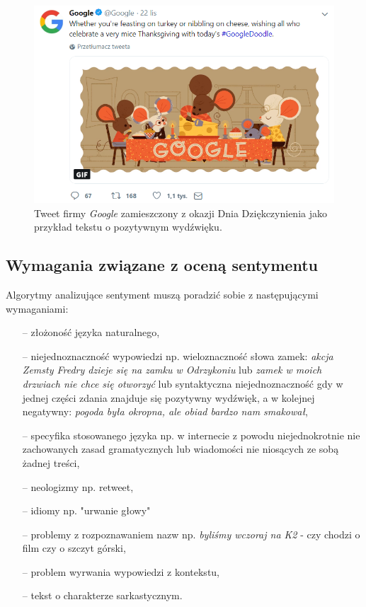 \begin{figure}[h] %
	\centering
	\includegraphics[width=0.8\linewidth]{img/nlp_google_tweet}
	\caption{Tweet firmy \textit{Google} zamieszczony z okazji Dnia Dziękczynienia jako przykład tekstu o pozytywnym wydźwięku.}
\end{figure}

\subsection{Wymagania związane z oceną sentymentu}
Algorytmy analizujące sentyment muszą poradzić sobie z następującymi wymaganiami:

\begin{itemize}
	\item[--] złożoność języka naturalnego,
	\item[--] niejednoznaczność wypowiedzi np. wieloznaczność słowa zamek: \textit{akcja Zemsty Fredry dzieje się na zamku w Odrzykoniu} lub \textit{zamek w moich drzwiach nie chce się otworzyć} lub syntaktyczna niejednoznaczność gdy w jednej części zdania znajduje się pozytywny wydźwięk, a w kolejnej negatywny: \textit{pogoda była okropna, ale obiad bardzo nam smakował},
	\item[--] specyfika stosowanego języka np. w internecie z powodu niejednokrotnie nie zachowanych zasad gramatycznych lub wiadomości nie niosących ze sobą żadnej treści,
	\item[--] neologizmy np. retweet,
	\item[--] idiomy np. "urwanie głowy"
	\item[--] problemy z rozpoznawaniem nazw np. \textit{byliśmy wczoraj na K2} - czy chodzi o film czy o szczyt górski,
	\item[--] problem wyrwania wypowiedzi z kontekstu,
	\item[--] tekst o charakterze sarkastycznym.
\end{itemize}

